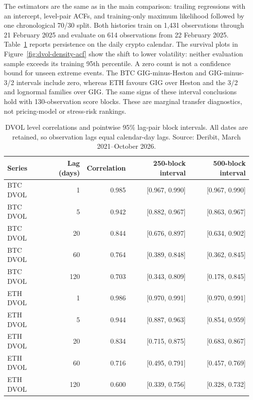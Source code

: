 The estimators are the same as in the main comparison: trailing regressions with
an intercept, level-pair ACFs, and training-only maximum likelihood followed by
one chronological 70/30 split. Both histories train on 1,431 observations through
21 February 2025 and evaluate on 614 observations from 22 February 2025.
Table~\ref{tab:dvol-acf} reports persistence on the daily crypto calendar. The
survival plots in Figure~\ref{fig:dvol-density-acf} show the shift to lower
volatility: neither evaluation sample exceeds its training 95th percentile.
A zero count is not a confidence bound for unseen extreme events. The BTC
GIG-minus-Heston and GIG-minus-3/2 intervals include zero, whereas ETH favours GIG over
Heston and the 3/2 and lognormal families over GIG. The same signs of
these interval conclusions hold with 130-observation score blocks. These are
marginal transfer diagnostics, not pricing-model or stress-risk rankings.

\begin{table}[htbp]\centering\small\begin{tabular}{@{}l r r r r@{}}\toprule Series & Lag (days) & Correlation & 250-block interval & 500-block interval\\\midrule

BTC DVOL & 1 & 0.985 & [0.967, 0.990] & [0.967, 0.990] \\

BTC DVOL & 5 & 0.942 & [0.882, 0.967] & [0.863, 0.967] \\

BTC DVOL & 20 & 0.844 & [0.676, 0.897] & [0.634, 0.902] \\

BTC DVOL & 60 & 0.764 & [0.389, 0.848] & [0.362, 0.845] \\

BTC DVOL & 120 & 0.703 & [0.343, 0.809] & [0.178, 0.845] \\

ETH DVOL & 1 & 0.986 & [0.970, 0.991] & [0.970, 0.991] \\

ETH DVOL & 5 & 0.944 & [0.887, 0.963] & [0.854, 0.959] \\

ETH DVOL & 20 & 0.834 & [0.715, 0.875] & [0.683, 0.867] \\

ETH DVOL & 60 & 0.716 & [0.495, 0.791] & [0.457, 0.769] \\

ETH DVOL & 120 & 0.600 & [0.339, 0.756] & [0.328, 0.732] \\

\bottomrule\end{tabular}\caption{DVOL level correlations and pointwise 95\% lag-pair block intervals. All dates are retained, so observation lags equal calendar-day lags. Source: Deribit, March 2021--October 2026.}\label{tab:dvol-acf}\end{table}

